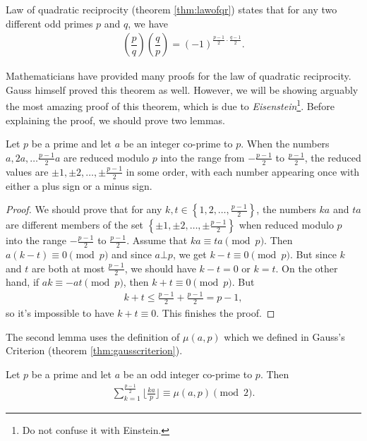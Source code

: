 \documentclass{subfile}
\begin{document}
Law of quadratic reciprocity (theorem \eqref{thm:lawofqr}) states that for any two different odd primes $p$ and $q$, we have
\begin{align*}
\left(\dfrac{p}{q}\right)\left(\dfrac{q}{p}\right)=(-1)^{\frac{p-1}{2}\cdot \frac{q-1}{2}}.
\end{align*}

Mathematicians have provided many proofs for the law of quadratic reciprocity. Gauss himself proved this theorem as well. However, we will be showing arguably the most amazing proof of this theorem, which is due to \textit{Eisenstein}\footnote{Do not confuse it with Einstein.}.
Before explaining the proof, we should prove two lemmas.

\begin{lemma}\label{lem:lawofqrlem1}
	Let $p$ be a prime and let $a$ be an integer co-prime to $p$. When the numbers $a, 2a, \ldots \frac{p-1}{2}a$ are reduced modulo $p$ into the range from $-\frac{p-1}{2}$ to $\frac{p-1}{2}$, the reduced values are $\pm 1, \pm 2, \dots, \pm \frac{p-1}{2}$ in some order, with each number appearing once with either a plus sign or a minus sign.
\end{lemma}

\begin{proof}\label{lem:lawofqrlem2}
	We should prove that for any $k, t \in \left\{1, 2, \dots, \frac{p-1}{2}\right\}$, the numbers $ka$ and $ta$ are different members of the set $\left\{ \pm 1, \pm 2, \dots, \pm \frac{p-1}{2} \right\}$ when reduced modulo $p$ into the range $-\frac{p-1}{2}$ to $\frac{p-1}{2}$. Assume that $ka \equiv ta \pmod p$. Then $a(k-t) \equiv 0 \pmod p$ and since $a \bot p$, we get $k-t \equiv 0 \pmod p$. But since $k$ and $t$ are both at most $\frac{p-1}{2}$, we should have $k-t=0$ or $k=t$. On the other hand, if $ak \equiv -at \pmod p$, then $k+t \equiv 0 \pmod p$. But
	\begin{align*}
	k+t \leq \frac{p-1}{2} + \frac{p-1}{2} = p-1,
	\end{align*}
	so it's impossible to have $k+t \equiv 0$. This finishes the proof.
\end{proof}

The second lemma uses the definition of $\mu(a,p)$ which we defined in Gauss's Criterion (theorem \eqref{thm:gausscriterion}).

\begin{lemma}
	Let $p$ be a prime and let $a$ be an odd integer co-prime to $p$. Then
	\begin{align*}
	\displaystyle \sum_{k=1}^{\frac{p-1}{2}} \Big\lfloor\frac{ka}{p} \Big\rfloor \equiv \mu(a,p) \pmod 2.
	\end{align*}
\end{lemma}
\end{document}
